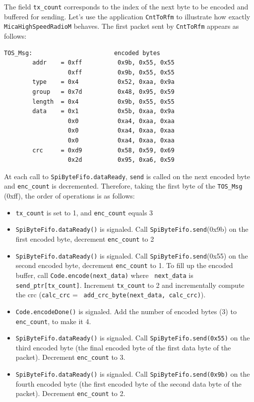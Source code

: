\documentclass[11pt]{article}
\begin{document}
The field {\tt tx\_count} corresponds to the index of the next byte to be
encoded and buffered for sending. Let's use the application {\tt CntToRfm}
to illustrate how exactly {\tt MicaHighSpeedRadioM} behaves. The first
packet sent by {\tt CntToRfm} appears as follows:

\newpage

\begin{verbatim}
TOS_Msg:                       encoded bytes 
        addr    = 0xff          0x9b, 0x55, 0x55
                  0xff          0x9b, 0x55, 0x55
        type    = 0x4           0x52, 0xaa, 0x9a
        group   = 0x7d          0x48, 0x95, 0x59
        length 	= 0x4           0x9b, 0x55, 0x55
        data    = 0x1           0x5b, 0xaa, 0x9a
                  0x0           0xa4, 0xaa, 0xaa
                  0x0           0xa4, 0xaa, 0xaa
                  0x0           0xa4, 0xaa, 0xaa
        crc     = 0xd9          0x58, 0x59, 0x69
                  0x2d          0x95, 0xa6, 0x59
\end{verbatim}

At each call to {\tt SpiByteFifo.dataReady}, {\tt send} is called on
the next encoded byte and {\tt enc\_count} is decremented. Therefore,
taking the first byte of the {\tt TOS\_Msg} (0xff), the order of
operations is as follows:

\begin{itemize}
\item {\tt tx\_count} is set to 1, and {\tt enc\_count} equals 3

\item {\tt SpiByteFifo.dataReady()} is signaled. Call {\tt SpiByteFifo.send}(0x9b) on the first encoded byte, decrement {\tt enc\_count} to 2

\item {\tt SpiByteFifo.dataReady()} is signaled. Call {\tt SpiByteFifo.send}(0x55) on the second encoded byte, decrement {\tt enc\_count} to 1.  To fill up the encoded buffer, call {\tt Code.encode(next\_data)} where {\tt
next\_data} is {\tt send\_ptr[tx\_count]}. Increment {\tt tx\_count}
to 2 and incrementally compute the crc ({\tt calc\_crc} = {\tt
add\_crc\_byte(next\_data, calc\_crc)}).

\item {\tt Code.encodeDone()} is signaled. Add the number of encoded bytes (3) to {\tt enc\_count}, to make it 4.

\item {\tt SpiByteFifo.dataReady()} is signaled. Call {\tt SpiByteFifo.send(0x55)} on the third encoded byte (the final encoded byte of the first data byte of the packet). Decrement {\tt enc\_count} to 3.

\item {\tt SpiByteFifo.dataReady()} is signaled. Call {\tt SpiByteFifo.send(0x9b)} on the fourth encoded byte (the first encoded byte of the second data byte of the packet). Decrement {\tt enc\_count} to 2.

\end{itemize}
\end{document}
